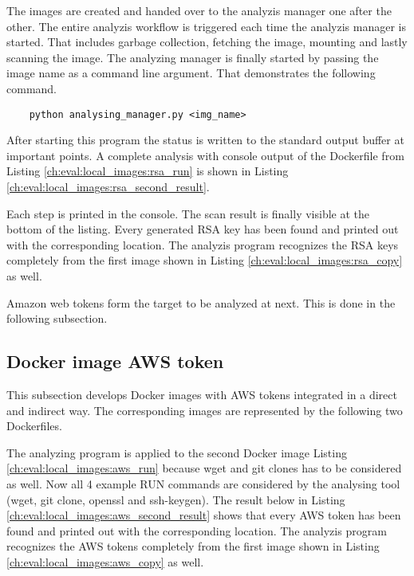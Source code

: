 The images are created and handed over to the analyzis manager one after the other.
The entire analyzis workflow is triggered each time the analyzis manager is started. 
That includes garbage collection, fetching the image, mounting and lastly scanning the image.
The analyzing manager is finally started by passing the image name as a command line argument. That demonstrates the following command.
\begin{lstlisting}
	python analysing_manager.py <img_name>
\end{lstlisting}
After starting this program the status is written to the standard output buffer at important points.
A complete analysis with console output of the Dockerfile from Listing \ref{ch:eval:local_images:rsa_run} is shown in Listing \ref{ch:eval:local_images:rsa_second_result}.

Each step is printed in the console. The scan result is finally visible at the bottom of the listing. 
Every generated RSA key has been found and printed out with the corresponding location.
The analyzis program recognizes the RSA keys completely from the first image shown in Listing \ref{ch:eval:local_images:rsa_copy} as well. 

Amazon web tokens form the target to be analyzed at next. This is done in the following subsection. 

\subsection{Docker image AWS token}
\label{ch:eval:local_images:aws}
This subsection develops Docker images with AWS tokens integrated in a direct and indirect way. 
The corresponding images are represented by the following two Dockerfiles.


The analyzing program is applied to the second Docker image Listing \ref{ch:eval:local_images:aws_run} because wget and git clones has to be considered as well. 
Now all 4 example RUN commands are considered by the analysing tool (wget, git clone, openssl and ssh-keygen). 
The result below in Listing \ref{ch:eval:local_images:aws_second_result} shows that every AWS token has been found and printed out with the corresponding location.
The analyzis program recognizes the AWS tokens completely from the first image shown in Listing \ref{ch:eval:local_images:aws_copy} as well.


